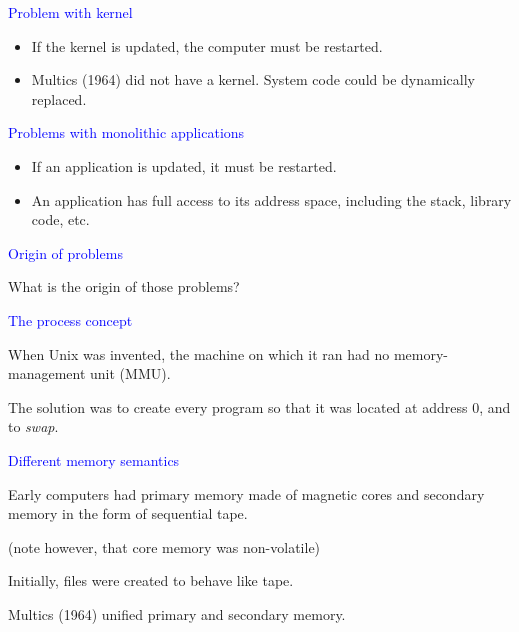 \documentclass{slides}
\newcommand{\ti}[1]{\begin{center}\Large{\textcolor{blue}{#1}}\end{center}}
\begin{document}
\begin{slide}\ti{Problem with kernel}
\vskip 0.5cm
\begin{itemize}
\item If the kernel is updated, the computer must be restarted.
\item Multics (1964) did not have a kernel.  System code could be
  dynamically replaced.
\end{itemize}

\vfill\end{slide}
\begin{slide}\ti{Problems with monolithic applications}

  \begin{itemize}
  \item If an application is updated, it must be restarted.
  \item An application has full access to its address space, including
    the stack, library code, etc.
  \end{itemize}

\vfill\end{slide}
\begin{slide}\ti{Origin of problems}

What is the origin of those problems?

\vfill\end{slide}
\begin{slide}\ti{The process concept}

When Unix was invented, the machine on which it ran had no
memory-management unit (MMU).

The solution was to create every program so that it was located at
address 0, and to \emph{swap}.

\vfill\end{slide}
\begin{slide}\ti{Different memory semantics}

Early computers had primary memory made of magnetic cores and
secondary memory in the form of sequential tape.

(note however, that core memory was non-volatile)

Initially, files were created to behave like tape.

Multics (1964) unified primary and secondary memory.

\vfill\end{slide}
\end{document}
